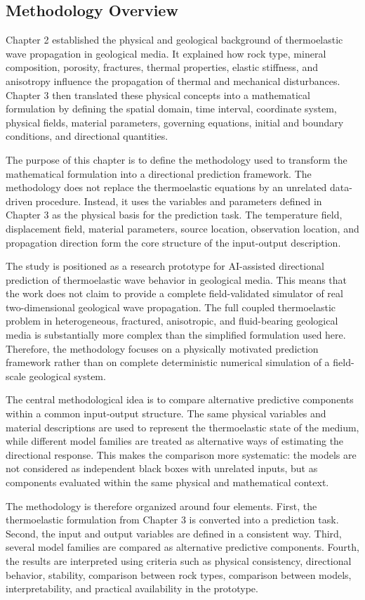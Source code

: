 \subsection{Methodology Overview}

Chapter 2 established the physical and geological background of thermoelastic wave propagation in geological media. It explained how rock type, mineral composition, porosity, fractures, thermal properties, elastic stiffness, and anisotropy influence the propagation of thermal and mechanical disturbances. Chapter 3 then translated these physical concepts into a mathematical formulation by defining the spatial domain, time interval, coordinate system, physical fields, material parameters, governing equations, initial and boundary conditions, and directional quantities.

The purpose of this chapter is to define the methodology used to transform the mathematical formulation into a directional prediction framework. The methodology does not replace the thermoelastic equations by an unrelated data-driven procedure. Instead, it uses the variables and parameters defined in Chapter 3 as the physical basis for the prediction task. The temperature field, displacement field, material parameters, source location, observation location, and propagation direction form the core structure of the input-output description.

The study is positioned as a research prototype for AI-assisted directional prediction of thermoelastic wave behavior in geological media. This means that the work does not claim to provide a complete field-validated simulator of real two-dimensional geological wave propagation. The full coupled thermoelastic problem in heterogeneous, fractured, anisotropic, and fluid-bearing geological media is substantially more complex than the simplified formulation used here. Therefore, the methodology focuses on a physically motivated prediction framework rather than on complete deterministic numerical simulation of a field-scale geological system.

The central methodological idea is to compare alternative predictive components within a common input-output structure. The same physical variables and material descriptions are used to represent the thermoelastic state of the medium, while different model families are treated as alternative ways of estimating the directional response. This makes the comparison more systematic: the models are not considered as independent black boxes with unrelated inputs, but as components evaluated within the same physical and mathematical context.

The methodology is therefore organized around four elements. First, the thermoelastic formulation from Chapter 3 is converted into a prediction task. Second, the input and output variables are defined in a consistent way. Third, several model families are compared as alternative predictive components. Fourth, the results are interpreted using criteria such as physical consistency, directional behavior, stability, comparison between rock types, comparison between models, interpretability, and practical availability in the prototype.

